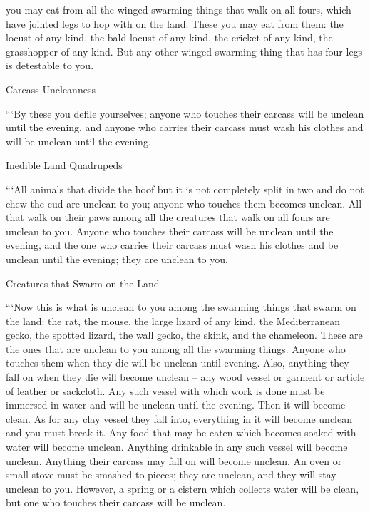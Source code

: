{you may eat
from all
the winged
swarming things
that walk
on
all fours,
which
have jointed
legs
to hop
with
on
the land.
These
you may eat
from them: the locust
of any kind,
the bald locust
of any kind,
the cricket
of any kind,
the grasshopper
of any kind.
But any
other winged
swarming thing
that
has four
legs
is detestable to you.
\par }{\SH Carcass Uncleanness
\par }{\PP {}“‘By these
you defile
yourselves; anyone
who touches
their carcass
will be unclean
until
the evening,
and anyone
who carries
their carcass
must wash
his clothes
and will be unclean
until
the evening.
\par }{\SH Inedible Land Quadrupeds
\par }{\PP {}“‘All
animals
that
divide
the hoof
but it is not
completely split in two
and do not
chew
the cud
are unclean
to you; anyone
who touches
them becomes unclean.
All
that walk
on
their paws
among all
the creatures
that walk
on
all
fours
are unclean
to you. Anyone
who touches
their carcass
will be unclean
until
the evening,
and the one who carries
their carcass
must wash
his clothes
and be unclean
until
the evening;
they
are unclean to you.
\par }{\SH Creatures that Swarm on the Land
\par }{\PP {}“‘Now this
is what is unclean
to you among the swarming things
that swarm
on
the land: the rat,
the mouse,
the large lizard
of any kind,
the Mediterranean gecko,
the spotted lizard,
the wall gecko,
the skink, and the chameleon.
These
are the ones that are unclean
to you among all
the swarming things.
Anyone
who touches
them when they die
will be unclean
until
evening.
Also, anything
they fall
on
when they
die
will become unclean
– any
wood
vessel
or
garment
or
article of leather
or
sackcloth.
Any
such vessel
with which
work
is done
must be immersed
in water
and will be unclean
until
the evening.
Then it will become clean.
As for any
clay
vessel
they
fall
into,
everything
in it
will become unclean
and you must break it.
Any
food
that
may be eaten
which
becomes soaked
with water
will become unclean.
Anything
drinkable
in any
such vessel
will become unclean.
Anything
their carcass
may
fall
on
will become unclean.
An oven
or small stove
must be smashed
to pieces; they
are unclean,
and they will stay
unclean to you.
However,
a spring
or a cistern
which collects
water
will be
clean,
but one who touches
their carcass
will be unclean.
}
